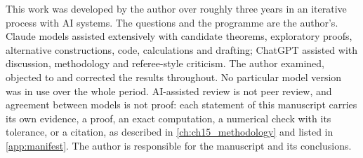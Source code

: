 This work was developed by the author over roughly three years in an iterative process with AI systems. The questions and the
programme are the author's. Claude models assisted extensively with candidate theorems, exploratory proofs, alternative constructions,
code, calculations and drafting; ChatGPT assisted with discussion, methodology and referee-style criticism. The author examined,
objected to and corrected the results throughout. No particular model version was in use over the whole period. AI-assisted review is
not peer review, and agreement between models is not proof: each statement of this manuscript carries its own evidence, a proof, an exact
computation, a numerical check with its tolerance, or a citation, as described in \cref{ch:ch15_methodology} and listed in
\cref{app:manifest}. The author is responsible for the manuscript and its conclusions.

\renewcommand{\thesection}{\thechapter.\arabic{section}}
